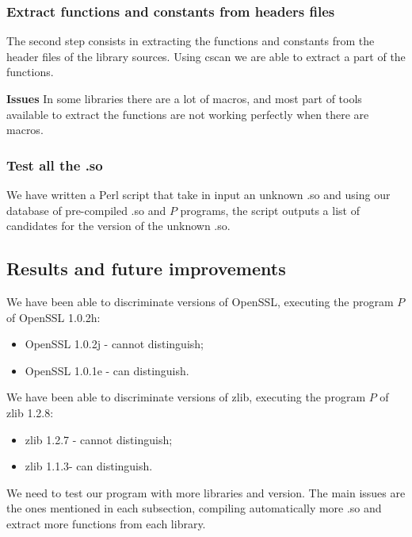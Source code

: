 \documentclass{article}
\begin{document}
   
   	\subsubsection{Extract functions and constants from headers files}
   	
    The second step consists in extracting the functions and constants from
    the header files of the library sources. Using cscan we are able to
    extract a part of the functions.
   	
    \textbf{Issues} In some libraries there are a lot of macros, and most part
    of tools available to extract the functions are not working perfectly when
    there are macros.   		
   	
   	
   	\subsubsection{Test all the .so}
   		
    We have written a Perl script that take in input an unknown .so and using
    our database of pre-compiled .so and $P$ programs, the script outputs a
    list of candidates for the version of the unknown .so.

   	
   	\subsection{Results and future improvements}
   	
        We have been able to discriminate versions of OpenSSL, executing the
        program $P$ of OpenSSL 1.0.2h:
        \begin{itemize}
            \item OpenSSL 1.0.2j - cannot distinguish; 
            \item OpenSSL 1.0.1e - can distinguish.
        \end{itemize}


        We have been able to discriminate versions of zlib, executing the
        program $P$ of zlib 1.2.8: 
        \begin{itemize}
            \item zlib 1.2.7 - cannot distinguish; 
            \item zlib 1.1.3- can distinguish.
        \end{itemize}

        We need to test our program with more libraries and version. The main
        issues are the ones mentioned in each subsection, compiling
        automatically more .so and extract more functions from each library.
\end{document}
